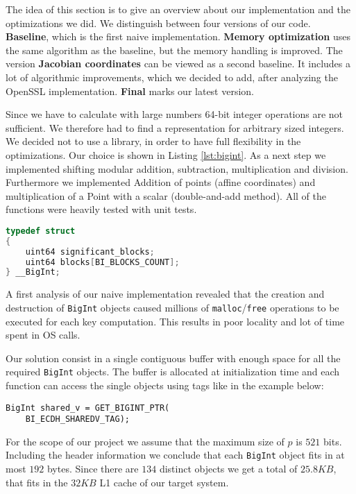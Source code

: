The idea of this section is to give an overview about our implementation and the optimizations we did. We distinguish between four versions of our code. \textbf{Baseline}, which is the first naive implementation. \textbf{Memory optimization} uses the same algorithm as the baseline, but the memory handling is improved. The version \textbf{Jacobian coordinates} can be viewed as a second baseline. It includes a lot of algorithmic improvements, which we decided to add, after analyzing the OpenSSL implementation. \textbf{Final} marks our latest version.

Since we have to calculate with large numbers 64-bit integer operations are not sufficient. We therefore had to find a representation for arbitrary sized integers. We decided not to use a library, in order to have full flexibility in the optimizations. Our choice is shown in Listing \ref{lst:bigint}. As a next step we implemented shifting modular addition, subtraction, multiplication and division. Furthermore we implemented Addition of points (affine coordinates) and multiplication of a Point with a scalar (double-and-add method). All of the functions were heavily tested with unit tests.

\begin{lstlisting}[frame=single,  captionpos=b, caption=representation of the arbitrary size integers, label=lst:bigint, language=c]
typedef struct 
{
    uint64 significant_blocks;    
    uint64 blocks[BI_BLOCKS_COUNT]; 
} __BigInt;
\end{lstlisting}


A first analysis of our naive implementation revealed that the creation and destruction of \texttt{BigInt} objects caused millions of \texttt{malloc}/\texttt{free} operations to be executed for each key computation. This results in poor locality and lot of time spent in OS calls.

Our solution consist in a single contiguous buffer with enough space for all the required \texttt{BigInt} objects. The buffer is allocated at initialization time and each function can access the single objects using tags like in the example below:

\begin{lstlisting}[frame=single, mathescape=true, captionpos=b, caption=Access by tag example]
BigInt shared_v = GET_BIGINT_PTR(
    BI_ECDH_SHAREDV_TAG);
\end{lstlisting}

For the scope of our project we assume that the maximum size of $p$ is $521$ bits. Including the header information we conclude that each \texttt{BigInt} object fits in at most $192$ bytes. Since there are $134$ distinct objects we get a total of $25.8KB$, that fits in the $32KB$ L1 cache of our target system.

